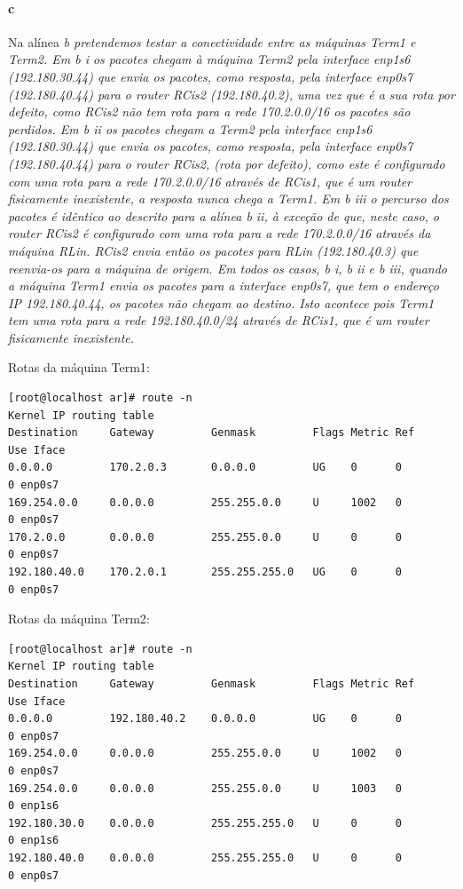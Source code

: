 \paragraph{c}
Na alínea \it{b} pretendemos testar a conectividade entre as máquinas \textsf{Term1} e \textsf{Term2}.
Em \it{b i} os pacotes chegam à máquina \textsf{Term2} pela interface enp1s6 (192.180.30.44) que envia os pacotes, como resposta, pela interface enp0s7 (192.180.40.44) para o \emph{router} \textsf{RCis2} (192.180.40.2), uma vez que é a sua rota por defeito, como \textsf{RCis2} não tem rota para a rede 170.2.0.0/16 os pacotes são perdidos.
Em \it{b ii} os pacotes chegam a \textsf{Term2} pela interface enp1s6 (192.180.30.44) que envia os pacotes, como resposta, pela interface enp0s7 (192.180.40.44) para o \emph{router} \textsf{RCis2}, (rota por defeito), como este é configurado com uma rota para a rede 170.2.0.0/16 através de \textsf{RCis1}, que é um \emph{router} fisicamente inexistente, a resposta nunca chega a \textsf{Term1}.
Em \it{b iii} o percurso dos pacotes é idêntico ao descrito para a alínea \it{b ii}, à exceção de que, neste caso, o \emph{router} \textsf{RCis2} é configurado com uma rota para a rede 170.2.0.0/16 através da máquina \textsf{RLin}. \textsf{RCis2} envia então os pacotes para \textsf{RLin} (192.180.40.3) que reenvia-os para a máquina de origem.
Em todos os casos, \it{b i}, \it{b ii} e \it{b iii}, quando a máquina \textsf{Term1} envia os pacotes para a interface enp0s7, que tem o endereço IP 192.180.40.44, os pacotes não chegam ao destino. Isto acontece pois \textsf{Term1} tem uma rota para a rede 192.180.40.0/24 através de \textsf{RCis1}, que é um \emph{router} fisicamente inexistente.

Rotas da máquina \textsf{Term1}:
\begin{verbatim}
[root@localhost ar]# route -n
Kernel IP routing table
Destination     Gateway         Genmask         Flags Metric Ref    Use Iface
0.0.0.0         170.2.0.3       0.0.0.0         UG    0      0        0 enp0s7
169.254.0.0     0.0.0.0         255.255.0.0     U     1002   0        0 enp0s7
170.2.0.0       0.0.0.0         255.255.0.0     U     0      0        0 enp0s7
192.180.40.0    170.2.0.1       255.255.255.0   UG    0      0        0 enp0s7
\end{verbatim}

Rotas da máquina \textsf{Term2}:
\begin{verbatim}
[root@localhost ar]# route -n
Kernel IP routing table
Destination     Gateway         Genmask         Flags Metric Ref    Use Iface
0.0.0.0         192.180.40.2    0.0.0.0         UG    0      0        0 enp0s7
169.254.0.0     0.0.0.0         255.255.0.0     U     1002   0        0 enp0s7
169.254.0.0     0.0.0.0         255.255.0.0     U     1003   0        0 enp1s6
192.180.30.0    0.0.0.0         255.255.255.0   U     0      0        0 enp1s6
192.180.40.0    0.0.0.0         255.255.255.0   U     0      0        0 enp0s7
\end{verbatim}

